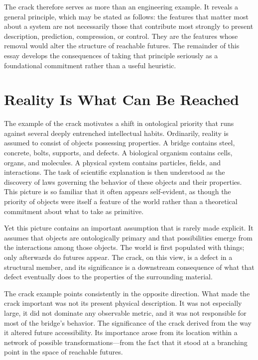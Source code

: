 \documentclass[12pt,a4paper]{article}
\theoremstyle{plain}
\theoremstyle{definition}
\theoremstyle{remark}
\begin{document}
The crack therefore serves as more than an engineering example. It reveals a
general principle, which may be stated as follows: the features that matter
most about a system are not necessarily those that contribute most strongly
to present description, prediction, compression, or control. They are the
features whose removal would alter the structure of reachable futures. The
remainder of this essay develops the consequences of taking that principle
seriously as a foundational commitment rather than a useful heuristic.

\section{Reality Is What Can Be Reached}

The example of the crack motivates a shift in ontological priority that runs
against several deeply entrenched intellectual habits. Ordinarily, reality is
assumed to consist of objects possessing properties. A bridge contains steel,
concrete, bolts, supports, and defects. A biological organism contains cells,
organs, and molecules. A physical system contains particles, fields, and
interactions. The task of scientific explanation is then understood as the
discovery of laws governing the behavior of these objects and their
properties. This picture is so familiar that it often appears self-evident,
as though the priority of objects were itself a feature of the world rather
than a theoretical commitment about what to take as primitive.

Yet this picture contains an important assumption that is rarely made
explicit. It assumes that objects are ontologically primary and that
possibilities emerge from the interactions among those objects. The world is
first populated with things; only afterwards do futures appear. The crack, on
this view, is a defect in a structural member, and its significance is a
downstream consequence of what that defect eventually does to the properties
of the surrounding material.

The crack example points consistently in the opposite direction. What made
the crack important was not its present physical description. It was not
especially large, it did not dominate any observable metric, and it was not
responsible for most of the bridge's behavior. The significance of the crack
derived from the way it altered future accessibility. Its importance arose
from its location within a network of possible transformations---from the
fact that it stood at a branching point in the space of reachable futures.
\end{document}
